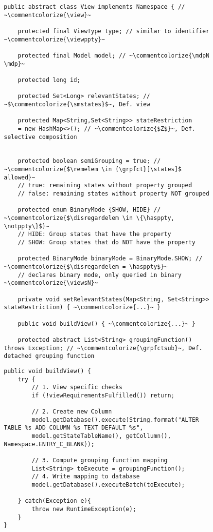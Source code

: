 \documentclass[preview]{standalone}
\begin{document}

\begin{figure}[!htb]
	\begin{lstlisting}[style=javaStyle, caption={Most relevant attributes and methods of class \texttt{View}}, label={lst:classview}]
public abstract class View implements Namespace { // ~\commentcolorize{\view}~
	
	protected final ViewType type; // similar to identifier ~\commentcolorize{\viewppty}~
	
	protected final Model model; // ~\commentcolorize{\mdpN \mdp}~
	
	protected long id; 
	
	protected Set<Long> relevantStates; // ~$\commentcolorize{\smstates}$~, Def. view
	
	protected Map<String,Set<String>> stateRestriction 
	= new HashMap<>(); // ~\commentcolorize{$Z$}~, Def. selective composition

	
	protected boolean semiGrouping = true; // ~\commentcolorize{$\remelem \in {\grpfct}[\states]$ allowed}~
	// true: remaining states without property grouped
	// false: remaining states without property NOT grouped
	
	protected enum BinaryMode {SHOW, HIDE} // ~\commentcolorize{$\disregardelem \in \{\hasppty, \notppty\}$}~
	// HIDE: Group states that have the property 
	// SHOW: Group states that do NOT have the property
	
	protected BinaryMode binaryMode = BinaryMode.SHOW; // ~\commentcolorize{$\disregardelem = \hasppty$}~
	// declares binary mode, only queried in binary ~\commentcolorize{\viewsN}~
	
	private void setRelevantStates(Map<String, Set<String>> stateRestriction) { ~\commentcolorize{...}~ }
	
	public void buildView() { ~\commentcolorize{...}~ }
		
	protected abstract List<String> groupingFunction() throws Exception; // ~\commentcolorize{\grpfctsub}~, Def. detached grouping function
\end{lstlisting}
\end{figure}

\begin{figure}[!htb]
	\begin{lstlisting}[style=javaStyle, caption={Implementation of \texttt{buildView()} function}, label={lst:buildview}]
public void buildView() {
	try {	
		// 1. View specific checks
		if (!viewRequirementsFulfilled()) return;
					
		// 2. Create new Column 
		model.getDatabase().execute(String.format("ALTER TABLE %s ADD COLUMN %s TEXT DEFAULT %s",
		model.getStateTableName(), getCollumn(), Namespace.ENTRY_C_BLANK));
		
		// 3. Compute grouping function mapping
		List<String> toExecute = groupingFunction();				
		// 4. Write mapping to database
		model.getDatabase().executeBatch(toExecute);
		
	} catch(Exception e){
		throw new RuntimeException(e);
	}		
}

\end{lstlisting}
\end{figure}
\end{document}
